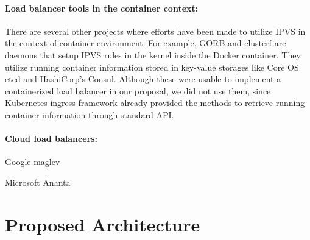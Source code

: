 \paragraph{\bf Load balancer tools in the container context:}
There are several other projects where efforts have been made to utilize IPVS in the context of container environment.
For example, GORB\cite{Sibiryov2015} and clusterf\cite{Aaltodoc:http://urn.fi/URN:NBN:fi:aalto-201611025433} are daemons 
that setup IPVS rules in the kernel inside the Docker container. 
They utilize running container information stored in key-value storages
like Core OS etcd\cite{CoreOSEtcd} and HashiCorp's Consul\cite{HashiCorpConsul}. 
Although these were usable to implement a containerized load balancer in our proposal, we did not use them, 
since Kubernetes ingress framework already provided the methods to retrieve running container information through standard API.

\paragraph{\bf Cloud load balancers:}

Google maglev\cite{eisenbud2016maglev}

Microsoft Ananta\cite{patel2013ananta}


\section{Proposed Architecture}\label{Architecture}

